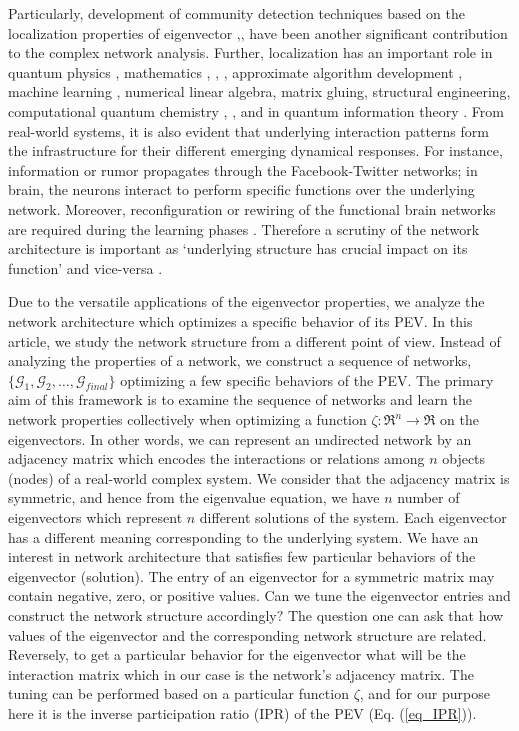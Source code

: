 \documentclass[envcountreset,oribibl]{llncs}
\begin{document}
Particularly, development of community detection techniques based on the localization properties of eigenvector \cite{community_2010},\cite{community_2015},\cite{mux_community_2017} have been another significant contribution to the complex network analysis. Further, localization has an important role in quantum physics \cite{anderson_loc_1985}, mathematics \cite{loc_math_1_2010}, \cite{loc_math_2_2013}, \cite{loc_math_3_2003}, approximate algorithm development \cite{approx_algo_2015}, machine learning \cite{machine_learning_loc_2016}, numerical linear algebra, matrix gluing, structural engineering, computational quantum chemistry \cite{loc_invariant_subspace_2011}, \cite{anderson_loc_linear_alg_1999}, and in quantum information theory \cite{localization_in_mat_2016}. From real-world systems, it is also evident that underlying interaction patterns form the infrastructure for their different emerging  dynamical responses. For instance, information or rumor propagates through the Facebook-Twitter networks; in brain, the neurons interact to perform specific functions over the underlying network. Moreover, reconfiguration or rewiring of the functional brain networks are required during the learning phases \cite{dynamic_reconfig_2011}. Therefore a scrutiny of the network architecture is important as `underlying structure has crucial  impact on its function' and vice-versa \cite{rev_Strogatz_2001}.

Due to the versatile applications of the eigenvector properties, we analyze the network architecture which optimizes a specific behavior of its PEV. In this article, we study the network structure from a different point of view. Instead of analyzing the properties of a network, we construct a sequence of networks, $\{\mathcal{G}_1, \mathcal{G}_2, \ldots, \mathcal{G}_{final} \}$ optimizing a few specific behaviors of the PEV. The primary aim of this framework is to examine the sequence of networks and learn the network properties collectively when optimizing a function $\zeta:\Re^n \rightarrow \Re$ on the eigenvectors. In other words, we can represent an undirected network by an adjacency matrix which encodes the interactions or relations among $n$ objects (nodes) of a real-world complex system. We consider that the adjacency matrix is symmetric, and hence from the eigenvalue equation, we have $n$ number of eigenvectors which represent $n$ different solutions of the system. Each eigenvector has a different meaning corresponding to the underlying system. We have an interest in network architecture that satisfies few particular behaviors of the eigenvector (solution). The entry of an eigenvector for a symmetric matrix may contain negative, zero, or positive values. Can we tune the eigenvector entries and construct the network structure accordingly$?$ The question one can ask that how values of the eigenvector and the corresponding network structure are related. Reversely, to get a particular behavior for the eigenvector what will be the interaction matrix which in our case is the network's adjacency matrix. The tuning can be performed based on a particular function $\zeta$, and for our purpose here it is the inverse participation ratio (IPR) of the PEV (Eq. (\ref{eq_IPR})). 
\end{document}
